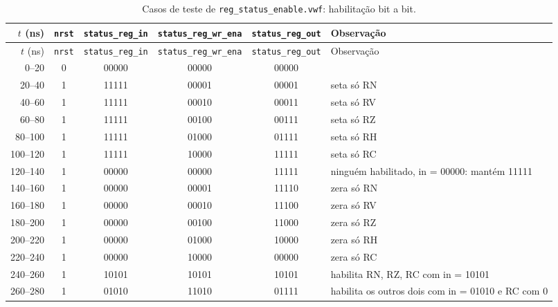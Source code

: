 {\scriptsize\setlength{\tabcolsep}{3pt}
\begin{longtable}{rccccp{4.4cm}}
\caption{Casos de teste de \texttt{reg\_status\_enable.vwf}: habilitação bit a bit.}
\label{tab:caso-reg-status-enable}\\
\hline $t$ (ns) & \texttt{nrst} & \texttt{status\_reg\_in} & \texttt{status\_reg\_wr\_ena} & \texttt{status\_reg\_out} & Observação \\ \hline \endfirsthead
\hline $t$ (ns) & \texttt{nrst} & \texttt{status\_reg\_in} & \texttt{status\_reg\_wr\_ena} & \texttt{status\_reg\_out} & Observação \\ \hline \endhead
0--20 & 0 & 00000 & 00000 & 00000 &  \\
20--40 & 1 & 11111 & 00001 & 00001 & seta só RN \\
40--60 & 1 & 11111 & 00010 & 00011 & seta só RV \\
60--80 & 1 & 11111 & 00100 & 00111 & seta só RZ \\
80--100 & 1 & 11111 & 01000 & 01111 & seta só RH \\
100--120 & 1 & 11111 & 10000 & 11111 & seta só RC \\
120--140 & 1 & 00000 & 00000 & 11111 & ninguém habilitado, in = 00000: mantém 11111 \\
140--160 & 1 & 00000 & 00001 & 11110 & zera só RN \\
160--180 & 1 & 00000 & 00010 & 11100 & zera só RV \\
180--200 & 1 & 00000 & 00100 & 11000 & zera só RZ \\
200--220 & 1 & 00000 & 01000 & 10000 & zera só RH \\
220--240 & 1 & 00000 & 10000 & 00000 & zera só RC \\
240--260 & 1 & 10101 & 10101 & 10101 & habilita RN, RZ, RC com in = 10101 \\
260--280 & 1 & 01010 & 11010 & 01111 & habilita os outros dois com in = 01010 e RC com 0 \\
\hline
\end{longtable}}
\vspace{-0.9cm}
